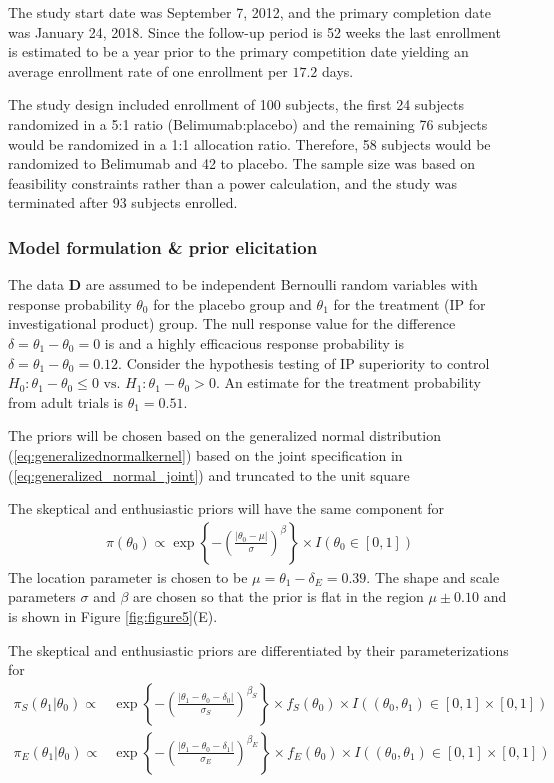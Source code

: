 \documentclass[12pt]{article}
\begin{document}
The study start date was September 7, 2012, and the primary completion date was January 24, 2018. Since the follow-up period is 52 weeks the last enrollment is estimated to be a year prior to the primary competition date yielding an average enrollment rate of one enrollment per $17.2$ days.

The study design included enrollment of 100 subjects, the first 24 subjects randomized in a 5:1 ratio (Belimumab:placebo) and the remaining 76 subjects would be randomized in a 1:1 allocation ratio. Therefore, 58 subjects would be randomized to Belimumab and 42 to placebo. The sample size was based on feasibility constraints rather than a power calculation, and the study was terminated after 93 subjects enrolled.

\subsubsection{Model formulation \& prior elicitation}
The data $\mathbf{D}$ are assumed to be independent Bernoulli random variables with response probability $\theta_0$ for the placebo group and $\theta_1$ for the treatment (IP for investigational product) group. The null response value for the difference $\delta=\theta_1-\theta_0=0$ is  and a highly efficacious response probability is $\delta=\theta_1-\theta_0=0.12$. Consider the hypothesis testing of IP superiority to control $H_0:\theta_1-\theta_0\leq 0\text{ vs. }H_1: \theta_1-\theta_0>0$. An estimate for the treatment probability from adult trials is $\theta_1=0.51$.

The priors will be chosen based on the generalized normal distribution (\ref{eq:generalizednormalkernel}) based on the joint specification in (\ref{eq:generalized_normal_joint}) and truncated to the unit square 

The skeptical and enthusiastic priors will have the same component for
\begin{align}
\pi(\theta_0)\propto \exp\left\{-\left(\frac{|\theta_0-\mu|}{\sigma}\right)^{\beta}\right\}\times I(\theta_0 \in [0,1])
\end{align}
The location parameter is chosen to be $\mu=\theta_1-\delta_E=0.39$. The shape and scale parameters $\sigma$ and $\beta$ are chosen so that the prior is flat in the region $\mu\pm 0.10$ and is shown in Figure \ref{fig:figure5}(E). 

The skeptical and enthusiastic priors are differentiated by their parameterizations for 
\begin{align}
\pi_S(\theta_1|\theta_0)\propto&\exp\left\{-\left(\frac{|\theta_1-\theta_0-\delta_0|}{\sigma_S}\right)^{\beta_S}\right\}\times f_S(\theta_0) \times I((\theta_0,\theta_1)\in [0,1]\times[0,1])\\
\pi_E(\theta_1|\theta_0)\propto&\exp\left\{-\left(\frac{|\theta_1-\theta_0-\delta_1|}{\sigma_E}\right)^{\beta_E}\right\}\times f_E(\theta_0) \times I((\theta_0,\theta_1)\in [0,1]\times[0,1])
\end{align}
\end{document}
